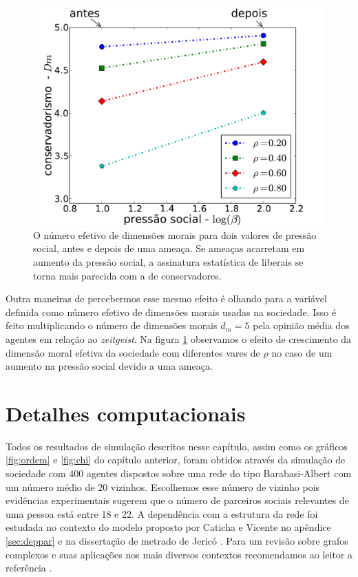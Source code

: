\begin{figure}
    \centering
    \includegraphics[scale=0.6]{Figures/threat.pdf}
    \caption{
        O número efetivo de dimensões morais para dois valores de pressão
        social, antes e depois de uma ameaça. Se ameaças acarretam em
        aumento da pressão social, a assinatura estatística de liberais se
        torna mais parecida com a de conservadores.
    } 
    \label{fig:threat}
\end{figure}

Outra maneiras de percebermos esse mesmo efeito é olhando para a variável
definida como número efetivo de dimensões morais usadas na sociedade. Isso é
feito multiplicando o número de dimensões morais $d_m = 5$ pela opinião média
dos agentes em relação ao \textit{zeitgeist}. Na figura \ref{fig:threat}
observamos o efeito de crescimento da dimensão moral efetiva da sociedade com
diferentes vares de $\rho$ no caso de um aumento na pressão social devido a uma
ameaça. 

\newpage
\section{Detalhes computacionais} %

Todos os resultados de simulação descritos nesse capítulo, assim como os
gráficos \ref{fig:ordem} e \ref{fig:chi} do capítulo anterior, foram obtidos
através da simulação de  sociedade com 400 agentes dispostos sobre uma rede
do tipo Barabasi-Albert com um número médio de 20 vizinhos.  Escolhemos esse
número de vizinho pois evidências experimentais \cite{Trusov2010} sugerem que
o número de parceiros sociais  relevantes de uma pessoa está entre 18 e 22. 
A dependência com a estrutura da rede foi estudada no contexto do modelo
proposto por Caticha e Vicente\citep{Caticha2011a} no apêndice
\ref{sec:deppar} e na dissertação de metrado de Jericó \cite{Jerico2012}.
Para um revisão sobre grafos complexos e suas aplicações nos mais diversos
contextos recomendamos ao leitor a referência \citep{Albert2002}.

